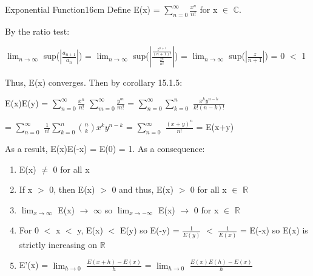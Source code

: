    \begin{definition}{Exponential Function}{16cm}
        Define E(x) = $\sum_{n=0}^{\infty} \frac{x^n}{n!}$
        for x $\in$ $\mathbb{C}$.
        
        By the ratio test:

        \hspace{0.5cm}
        $\lim_{n \rightarrow \infty}$ sup($|\frac{a_{n+1}}{a_n}|$)
        = $\lim_{n \rightarrow \infty}$ sup($|\frac{\frac{z^{n+1}}{(n+1)!}}
                                                    {\frac{z^n}{n!}}|$)
        = $\lim_{n \rightarrow \infty}$ sup($|\frac{z}{n+1}|$)
        = 0 $<$ 1

        Thus, E(x) converges.
        Then by {\color{orange} corollary 15.1.5}:

        \hspace{0.5cm}
        E(x)E(y)
        = $\sum_{n=0}^{\infty} \frac{x^n}{n!}$ $\sum_{m=0}^{\infty} \frac{y^m}{m!}$
        = $\sum_{n=0}^{\infty} \sum_{k=0}^n$ $\frac{x^k y^{n-k}}{k!(n-k)!}$

        \hspace{2.7cm}
        = $\sum_{n=0}^{\infty}$ $\frac{1}{n!} \sum_{k=0}^n \binom{n}{k} x^k y^{n-k}$
        = $\sum_{n=0}^{\infty}$ $\frac{(x+y)^n}{n!}$
        = E(x+y)

        \vspace{0.1cm}

        As a result, E(x)E(-x) = E(0) = 1.
        As a consequence:

        \begin{enumerate}[label=(\alph*), leftmargin=1.5cm, itemsep=0.1cm]
            \item E(x) $\not =$ 0 for all x
            
            \item If x $>$ 0, then E(x) $>$ 0 and thus,
                E(x) $>$ 0 for all x $\in$ $\mathbb{R}$
            
            \item $\lim_{x \rightarrow \infty}$ E(x) $\rightarrow$ $\infty$
                so $\lim_{x \rightarrow -\infty}$ E(x) $\rightarrow$ 0
                for x $\in$ $\mathbb{R}$

            \item For 0 $<$ x $<$ y, E(x) $<$ E(y) so
                E(-y) = $\frac{1}{E(y)}$ $<$ $\frac{1}{E(x)}$ = E(-x)
                so E(x) is strictly increasing on $\mathbb{R}$

            \item E'(x) = $\lim_{h \rightarrow 0}$ $\frac{E(x+h) - E(x)}{h}$
                = $\lim_{h \rightarrow 0}$ $\frac{E(x)E(h) - E(x)}{h}$


\end{enumerate}
\end{definition}

